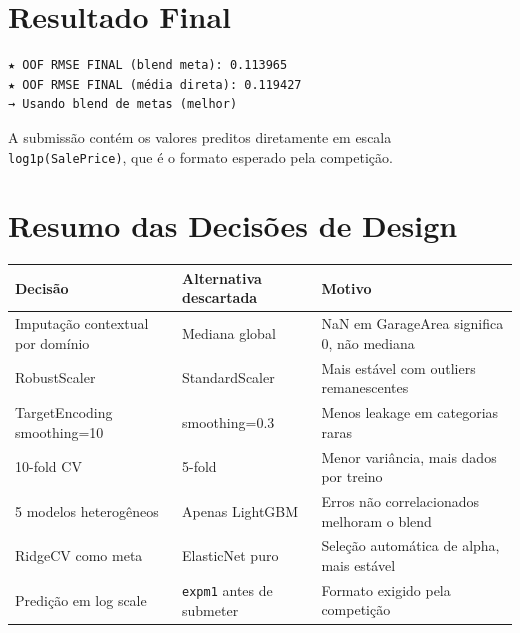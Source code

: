 \documentclass[11pt]{article}
\begin{document}
\section{Resultado Final}
\label{sec:org95c64c8}

\begin{verbatim}
★ OOF RMSE FINAL (blend meta): 0.113965
★ OOF RMSE FINAL (média direta): 0.119427
→ Usando blend de metas (melhor)
\end{verbatim}

A submissão contém os valores preditos diretamente em escala
\texttt{log1p(SalePrice)}, que é o formato esperado pela competição.
\section{Resumo das Decisões de Design}
\label{sec:orgf9a4b72}

\begin{center}
\begin{tabular}{lll}
Decisão & Alternativa descartada & Motivo\\
\hline
Imputação contextual por domínio & Mediana global & NaN em GarageArea significa 0, não mediana\\
RobustScaler & StandardScaler & Mais estável com outliers remanescentes\\
TargetEncoding smoothing=10 & smoothing=0.3 & Menos leakage em categorias raras\\
10-fold CV & 5-fold & Menor variância, mais dados por treino\\
5 modelos heterogêneos & Apenas LightGBM & Erros não correlacionados melhoram o blend\\
RidgeCV como meta & ElasticNet puro & Seleção automática de alpha, mais estável\\
Predição em log scale & \texttt{expm1} antes de submeter & Formato exigido pela competição\\
\end{tabular}
\end{center}
\end{document}
